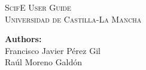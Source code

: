 \documentclass[11pt]{article}
\begin{document}
\thispagestyle{empty}
\begin{titlepage}
	\begin{center}
		\textsc{\Huge ScifE User Guide}
		\vspace*{0.5in}\\
		\huge{\textsc{Universidad de Castilla-La Mancha}}
		\vspace*{0.6in}\\
		\begin{figure}[h!]
			\centering
			\hspace{.5cm}
		\end{figure}
		\vspace{0.6in}
		\huge{\textbf{Authors:}\\Francisco Javier Pérez Gil\\Raúl Moreno Galdón}
	\end{center}
\end{titlepage}
\end{document}
